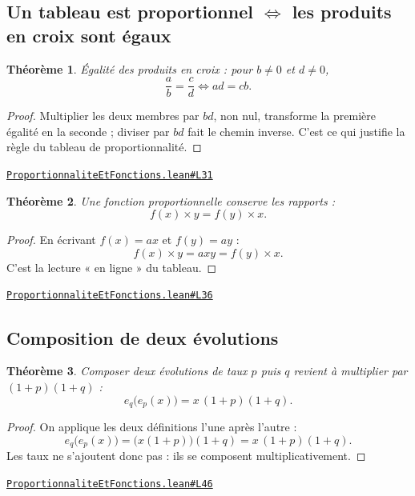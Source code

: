 \documentclass[11pt,a4paper]{article}
\theoremstyle{definition}
\theoremstyle{plain}
\newtheorem{theoreme}{Théorème}
\newcommand{\source}[2]{\par\smallskip\noindent\hfill{\footnotesize\href{#1}{\texttt{#2}}}\par\smallskip}
\begin{document}
\subsection{Un tableau est proportionnel \(\iff\) les produits en croix sont égaux}

\begin{theoreme}
Égalité des produits en croix : pour $b \ne 0$ et $d \ne 0$,
\[ \frac{a}{b} = \frac{c}{d} \iff ad = cb . \]
\end{theoreme}

\begin{proof}
Multiplier les deux membres par $bd$, non nul, transforme la première égalité en la
seconde ; diviser par $bd$ fait le chemin inverse. C'est ce qui justifie la règle du
tableau de proportionnalité.
\end{proof}
\source{https://github.com/Commutator-IO/learn-lean/blob/main/cours/01-college/05-proportionnalite-et-fonctions/ProportionnaliteEtFonctions.lean\#L31}{ProportionnaliteEtFonctions.lean\#L31}

\begin{theoreme}
Une fonction proportionnelle conserve les rapports :
\[ f(x) \times y = f(y) \times x . \]
\end{theoreme}

\begin{proof}
En écrivant $f(x) = ax$ et $f(y) = ay$ :
\[ f(x) \times y = axy = f(y) \times x . \]
C'est la lecture « en ligne » du tableau.
\end{proof}
\source{https://github.com/Commutator-IO/learn-lean/blob/main/cours/01-college/05-proportionnalite-et-fonctions/ProportionnaliteEtFonctions.lean\#L36}{ProportionnaliteEtFonctions.lean\#L36}

\subsection{Composition de deux évolutions}

\begin{theoreme}
Composer deux évolutions de taux $p$ puis $q$ revient à multiplier par $(1+p)(1+q)$ :
\[ e_q\bigl(e_p(x)\bigr) = x\,(1+p)(1+q) . \]
\end{theoreme}

\begin{proof}
On applique les deux définitions l'une après l'autre :
\[ e_q\bigl(e_p(x)\bigr) = \bigl(x(1+p)\bigr)(1+q) = x\,(1+p)(1+q) . \]
Les taux ne s'ajoutent donc pas : ils se composent multiplicativement.
\end{proof}
\source{https://github.com/Commutator-IO/learn-lean/blob/main/cours/01-college/05-proportionnalite-et-fonctions/ProportionnaliteEtFonctions.lean\#L46}{ProportionnaliteEtFonctions.lean\#L46}
\end{document}
